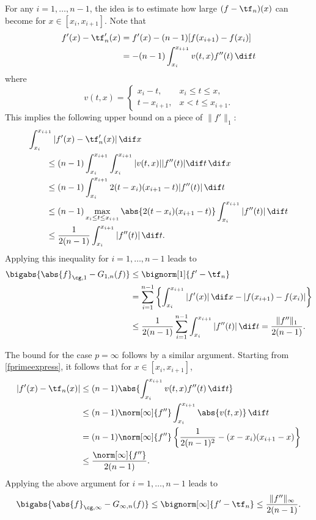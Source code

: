 \documentclass[final]{elsarticle}
\newcommand{\Gnorm}[2]{\abs{#2}_{\cg,#1}}
\theoremstyle{definition}
\theoremstyle{remark}
\begin{document}
For any $i=1, \ldots, n-1$, the idea is to estimate how large $(f-\tf_n)(x)$ can become for $x \in [x_i,x_{i+1}]$.  Note that
\begin{align}
\nonumber
f'(x)-\tf'_n(x) & = f'(x) - (n-1)[f(x_{i+1})-f(x_{i})] \\
& = -(n-1)\int_{x_i}^{x_{i+1}}v(t,x)f''(t) \, \dif t
\label{fprimeexpress}
\end{align}
where 
\begin{equation*}
v(t,x)=\begin{cases}  x_i-t, & x_i\leq t\leq x,\\
t-x_{i+1}, & x< t \leq x_{i+1}.
\end{cases}
\end{equation*}
This implies the following upper bound on a piece of $\|f'\|_{1}$:
\begin{align*}
\MoveEqLeft{\int_{x_i}^{x_{i+1}}|f'(x)-\tf'_n(x)| \, \dif x}\\
& \le (n-1) \int_{x_i}^{x_{i+1}} \int_{x_i}^{x_{i+1}}|v(t,x)||f''(t)| \dif t \, \dif x\\
& \le  (n-1)\int_{x_i}^{x_{i+1}}2(t-x_i)(x_{i+1}-t)|f''(t)| \, \dif t \\
& \le  (n-1) \max_{x_i \le t \le x_{i+1}} \abs{2(t-x_i)(x_{i+1}-t)} \int_{x_i}^{x_{i+1}} |f''(t)| \, \dif t \\
&  \le \frac{1}{2(n-1)}\int_{x_i}^{x_{i+1}} |f''(t)| \, \dif t .
\end{align*}
Applying this inequality for $i=1, \ldots, n-1$ leads to 
\begin{align*}
\bigabs{\Gnorm{1}{f} - G_{1,n}(f)} &  \le \bignorm[1]{f' -\tf_n} \\
& = \sum_{i=1}^{n-1} \left \{  \int_{x_i}^{x_{i+1}}|f'(x)|\, \dif x - |f(x_{i+1})-f(x_i)| \right \} \\
& \le \frac{1}{2(n-1)} \sum_{i=1}^{n-1} \int_{x_i}^{x_{i+1}} |f''(t)| \, \dif t = 
\frac{\|f''\|_{1}}{2(n-1)}.
 \end{align*}

The bound for the case $p=\infty$ follows by a similar argument.  Starting from \eqref{fprimeexpress}, it follows that for $x \in [x_i,x_{i+1}]$,
\begin{align*}
|f'(x)-\tf_n(x)|
&\le(n-1)\abs{ \int_{x_i}^{x_{i+1}} v(t,x) f''(t) \, \dif t} \\
& \le (n-1) \norm[\infty]{f''}\int_{x_i}^{x_{i+1}} \abs{v(t,x)} \, \dif t \\
&=(n-1)\norm[\infty]{f''} \left \{\frac{1}{2(n-1)^2} - (x-x_i)(x_{i+1}-x) \right\} \\
&\le \frac{\norm[\infty]{f''}}{2(n-1)}.
\end{align*}
Applying the above argument for $i=1, \ldots, n-1$ leads to 
\begin{equation*}
\bigabs{\Gnorm{\infty}{f} - G_{\infty,n}(f)} \le \bignorm[\infty]{f' -\tf_n} \le  
\frac{\|f''\|_{\infty}}{2(n-1)}.
 \end{equation*}
\end{document}
